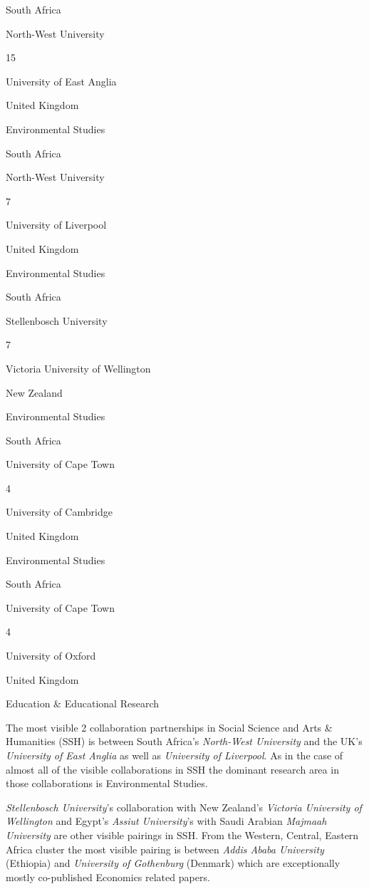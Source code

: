 \documentclass[12pt,twoside]{report}
\begin{document}
{South Africa}

{North-West University }

{15}

{University of East Anglia }

{United Kingdom}

{Environmental Studies }

{South Africa}

{North-West University }

{7 }

{University of Liverpool }

{United Kingdom}

{Environmental Studies }

{South Africa}

{Stellenbosch University}

{7 }

{Victoria University of Wellington }

{New Zealand }

{Environmental Studies }

{South Africa}

{University of Cape Town}

{4 }

{University of Cambridge }

{United Kingdom}

{Environmental Studies }

{South Africa}

{University of Cape Town}

{4 }

{University of Oxford }

{United Kingdom}

{Education \& Educational Research}

The most visible 2 collaboration partnerships in Social Science and Arts \& Humanities (SSH) is between South Africa's \emph{North-West University} and the UK's \emph{University of East Anglia} as well as \emph{University of Liverpool}. As in the case of almost all of the visible collaborations in SSH the dominant research area in those collaborations is Environmental Studies.

\emph{Stellenbosch University}'s collaboration with New Zealand's \emph{Victoria University of Wellington} and Egypt's \emph{Assiut University}'s with Saudi Arabian \emph{Majmaah University} are other visible pairings in SSH. From the Western, Central, Eastern Africa cluster the most visible pairing is between \emph{Addis Ababa University} (Ethiopia) and \emph{University of Gothenburg} (Denmark) which are exceptionally mostly co-published Economics related papers.
\end{document}
